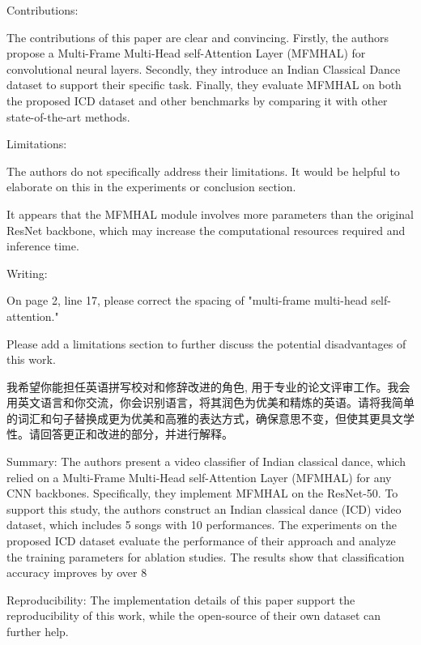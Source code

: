Contributions:

The contributions of this paper are clear and convincing. Firstly, the authors propose a Multi-Frame Multi-Head self-Attention Layer (MFMHAL) for convolutional neural layers. Secondly, they introduce an Indian Classical Dance dataset to support their specific task. Finally, they evaluate MFMHAL on both the proposed ICD dataset and other benchmarks by comparing it with other state-of-the-art methods.

Limitations:

The authors do not specifically address their limitations. It would be helpful to elaborate on this in the experiments or conclusion section.

It appears that the MFMHAL module involves more parameters than the original ResNet backbone, which may increase the computational resources required and inference time.

Writing:

On page 2, line 17, please correct the spacing of "multi-frame multi-head self-attention."

Please add a limitations section to further discuss the potential disadvantages of this work.












我希望你能担任英语拼写校对和修辞改进的角色, 用于专业的论文评审工作。我会用英文语言和你交流，你会识别语言，将其润色为优美和精炼的英语。请将我简单的词汇和句子替换成更为优美和高雅的表达方式，确保意思不变，但使其更具文学性。请回答更正和改进的部分，并进行解释。

Summary: The authors present a video classifier of Indian classical dance, which relied on a Multi-Frame Multi-Head self-Attention Layer (MFMHAL) for any CNN backbones. Specifically, they implement MFMHAL on the ResNet-50. To support this study, the authors construct an Indian classical dance (ICD) video dataset, which includes 5 songs with 10 performances. The experiments on the proposed ICD dataset evaluate the performance of their approach and analyze the training parameters for ablation studies. The results show that classification accuracy improves by over 8%

Reproducibility: The implementation details of this paper support the reproducibility of this work, while the open-source of their own dataset can further help.

